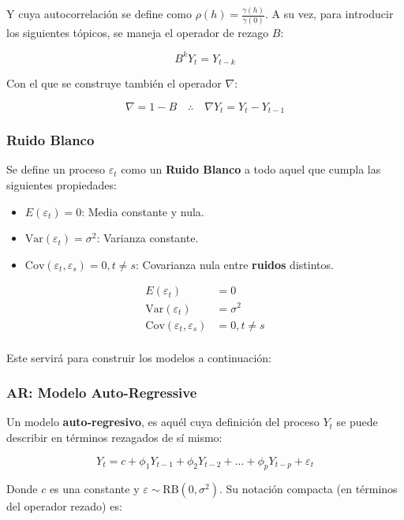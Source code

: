 \documentclass[10pt,twoside,xcolor=table,x11anmes]{IEEEtran}
\begin{document}
Y cuya autocorrelación se define como $\rho(h) = \frac{\gamma(h)}{\gamma(0)}$. A su vez, para introducir los siguientes tópicos, se maneja el operador de rezago $B$:

$$B^kY_t = Y_{t - k}$$

Con el que se construye también el operador $\nabla$:

$$\nabla = 1-B\quad\therefore\quad\nabla Y_t =Y_t - Y_{t-1}$$

\subsubsection{Ruido Blanco}

Se define un proceso $\varepsilon_t$ como un \textbf{Ruido Blanco} a todo aquel que cumpla las siguientes propiedades:

\begin{itemize}
    \item $E(\varepsilon_t) = 0$: Media constante y nula.
    \item $\text{Var}(\varepsilon_t)=\sigma^2$: Varianza constante.
    \item $\text{Cov}(\varepsilon_t, \varepsilon_s) = 0, t\neq s$: Covarianza nula entre \textbf{ruidos} distintos.
\end{itemize}

\begin{equation*}
    \begin{split}
         E(\varepsilon_t) &= 0\\
         \text{Var}(\varepsilon_t)&=\sigma^2\\
         \text{Cov}(\varepsilon_t, \varepsilon_s) &= 0, t\neq s\\
    \end{split}
\end{equation*}

Este servirá para construir los modelos a continuación:

\subsubsection{AR: Modelo Auto-Regressive}

Un modelo \textbf{auto-regresivo}, es aquél cuya definición del proceso $Y_t$ se puede describir en términos rezagados de sí mismo:

$$Y_t = c + \phi_1 Y_{t-1} +\phi_2 Y_{t-2}+\dots+ \phi_p Y_{t-p} + \varepsilon_t$$

Donde $c$ es una constante y $\varepsilon\sim \text{RB}(0,\sigma^2)$. Su notación compacta (en términos del operador rezado) es:
\end{document}
